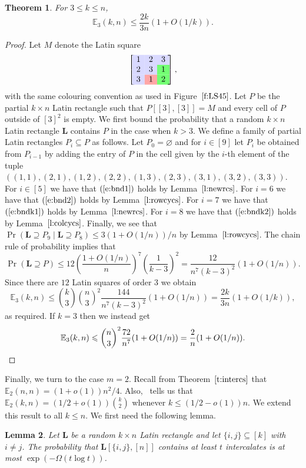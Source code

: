 \documentclass[12pt]{article}
\providecommand{\con}{\cellcolor{blue!15}}
\providecommand{\ctw}{\cellcolor{red!35}}
\providecommand{\cth}{\cellcolor{green!55}}
\newtheorem{thm}{Theorem}[section]
\newtheorem{lem}[thm]{Lemma}
\theoremstyle{definition}
\numberwithin{equation}{section}
\def\eref#1{$(\ref{#1})$}
\def\lref#1{Lemma~$\ref{#1}$}
\def\tref#1{Theorem~$\ref{#1}$}
\def\fref#1{Figure~$\ref{#1}$}
\renewcommand{\leq}{\leqslant}
\renewcommand{\le}{\leqslant}
\renewcommand{\emptyset}{\varnothing}
\renewcommand{\L}{\mathbf{L}}
\newcommand{\E}{\mathbb{E}}
\begin{document}
	\begin{thm} For $3\le k\le n$,
		\[
		\E_3(k, n) \leq \frac{2k}{3n}(1+O(1/k)).
		\]
	\end{thm}
	
	\begin{proof} 
		Let $M$ denote the Latin square
		\[
		\left[\;
		\begin{matrix}
			\con1&\con2&\con3\\
			\con2&\con3&\cth1\\
			\con3&\ctw1&\cth2
		\end{matrix}
		\;
		\right],
		\]
		with the same colouring convention as used in \fref{f:LS45}.  Let
		$P$ be the partial $k \times n$ Latin rectangle such that
		$P[[3],[3]]=M$ and every cell of $P$ outside of $[3]^2$ is empty. We
		first bound the probability that a random $k \times n$ Latin
		rectangle $\L$ contains $P$ in the case when $k>3$. We define a
		family of partial Latin rectangles $P_i\subseteq P$ as follows. Let
		$P_0 = \emptyset$ and for $i\in[9]$ let $P_i$ be obtained from
		$P_{i-1}$ by adding the entry of $P$ in the cell given by the $i$-th
		element of the tuple $((1, 1), (2, 1), (1, 2), (2, 2), (1, 3), (2,
		3), (3, 1), (3, 2), (3, 3))$. For $i \in [5]$ we have that
		\eref{e:bnd1} holds by \lref{l:newrcs}. For $i = 6$ we have that
		\eref{e:bnd2} holds by \lref{l:rowcycs}. For $i = 7$ we have that
		\eref{e:bndk1} holds by \lref{l:newrcs}. For $i = 8$ we have that
		\eref{e:bndk2} holds by \lref{l:colcycs}. Finally, we see that
		$\Pr(\L \supseteq P_9 \mid \L \supseteq P_{8}) \leq 3(1+O(1/n))/n$
		by \lref{l:rowcycs}. The chain rule of probability implies that
		\[
		\Pr(\L \supseteq P) \leq 12\left(\frac{1+O(1/n)}n\right)^7\left(\frac{1}{k-3}\right)^2 = \frac{12}{n^7(k-3)^2}(1+O(1/n)).
		\]
		Since there are $12$ Latin squares of order $3$ we obtain
		\[
		\E_3(k,n) \leq \binom{k}{3}\binom{n}{3}^2\frac{144}{n^7(k-3)^2}(1+O(1/n)) = \frac{2k}{3n}(1+O(1/k)),
		\]
		as required. If $k=3$ then we instead get
		\[
		\E_3(k,n) \leq \binom{n}{3}^2\frac{72}{n^7}(1+O(1/n)) = \frac{2}{n}(1+O(1/n)).
		\qedhere  \]
	\end{proof}
	
	Finally, we turn to the case $m=2$. Recall from \tref{t:intercs} that
	$\mathbb{E}_2(n,n) =
	(1+o(1))n^2/4$. Also,~\cite[Corollary~$1.7$]{subsqrandom} tells us
	that $\mathbb{E}_2(k,n)=(1/2+o(1))\binom{k}{2}$ whenever
	$k\leq(1/2-o(1))n$. We extend this result to all $k \leq n$. We first
	need the following lemma.
	
	\begin{lem}\label{l:intercbound}
		Let $\mathbf{L}$ be a random $k \times n$ Latin rectangle and let
		$\{i, j\} \subseteq [k]$ with $i \neq j$. The probability that
		$\L[\{i, j\}, [n]]$ contains at least $t$ intercalates is at most
		$\exp(-\Omega(t\log t))$.
	\end{lem}
	
\end{document}
